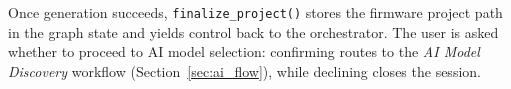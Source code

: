 Once generation succeeds, \texttt{finalize\_project()} stores the firmware project path in the graph state and yields control back to the orchestrator. The user is asked whether to proceed to AI model selection: confirming routes to the \textit{AI Model Discovery} workflow (Section~\ref{sec:ai_flow}), while declining closes the session.
